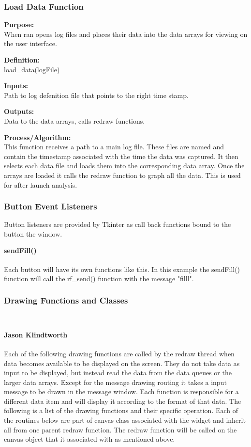\documentclass[10pt,draftclsnofoot,onecolumn,compsoc]{IEEEtran}
\begin{document}
\subsubsection{Load Data Function}
{\bf Purpose:} \\
When ran opens log files and places their data into the data arrays for viewing on the user interface. \par
{\bf Definition:} \\ 
load\_data(logFile) \par
{\bf Inputs:} \\ Path to log defenition file that points to the right time stamp. \par
{\bf Outputs:} \\ Data to the data arrays, calls redraw functions. \par
{\bf Process/Algorithm:} \\
This function receives a path to a main log file. These files are named and contain the timestamp associated with the time the data was captured. It then selects each data file and loads them into the corresponding data array. Once the arrays are loaded it calls the redraw function to graph all the data. This is used for after launch analysis.\par

\subsubsection{Button Event Listeners}
Button listeners are provided by Tkinter as call back functions bound to the button the window. 

{\bf sendFill() }
\\  \\
Each button will have its own functions like this. In this example the sendFill() function will call the rf\_send() function with the message "filll".

\subsubsection{Drawing Functions and Classes}\

{\bf Jason Klindtworth }
\\ \\
Each of the following drawing functions are called by the redraw thread when data becomes available to be displayed on the screen. They do not take data as input to be displayed, but instead read the data from the data queues or the larger data arrays. Except for the message drawing routing it takes a input message to be drawn in the message window. Each function is responsible for a different data item and will display it according to the format of that data. The following is a list of the drawing functions and their specific operation. Each of the routines below are part of canvas class associated with the widget and inherit all from one parent redraw function. The redraw function will be called on the canvas object that it associated with as mentioned above.
\end{document}
